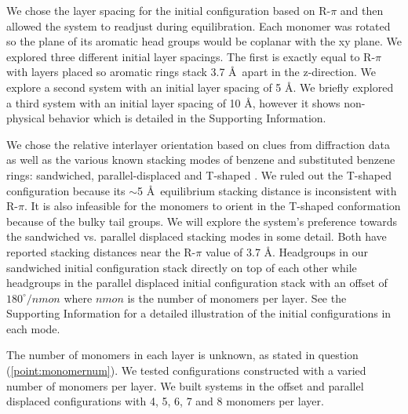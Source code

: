 \documentclass[journal=jpcbfk,manusciprt=article]{achemso}
\begin{document}
  We chose the layer spacing for the initial configuration based on R-$\pi$ and
  then allowed the system to readjust during equilibration. Each monomer was
  rotated so the plane of its aromatic head groups would be coplanar with the xy
  plane. We explored three different initial layer spacings. The first is exactly
  equal to R-$\pi$ with layers placed so aromatic rings stack 3.7 \AA~apart in
  the z-direction. We explore a second system with an initial layer spacing of 5
  \AA. We briefly explored a third system with an initial layer spacing of 10
  \AA, however it shows non-physical behavior which is detailed in the 
  Supporting Information. 


  We chose the relative interlayer orientation based on clues from diffraction
  data as well as the various known stacking modes of benzene and substituted
  benzene rings: sandwiched, parallel-displaced and T-shaped
  \cite{sinnokrot_estimates_2002}. We ruled out the T-shaped configuration
  because its $\sim$5 \AA~equilibrium stacking distance
  \cite{sinnokrot_estimates_2002} is inconsistent with R-$\pi$. It is also
  infeasible for the monomers to orient in the T-shaped conformation because of
  the bulky tail groups. We will explore the system's preference towards the
  sandwiched vs. parallel displaced stacking modes in some detail. Both have
  reported stacking distances near the R-$\pi$ value of 3.7 \AA. Headgroups in
  our sandwiched initial configuration stack directly on top of each other while
  headgroups in the parallel displaced initial configuration stack with an offset
  of $180^\circ/nmon$ where $nmon$ is the number of monomers per layer. See
  the Supporting Information for a detailed illustration of the initial
  configurations in each mode.

  The number of monomers in each layer is unknown, as stated in question
  (\ref{point:monomernum}). We tested configurations constructed with a varied
  number of monomers per layer. We built systems in the offset and parallel
  displaced configurations with 4, 5, 6, 7 and 8 monomers per layer.
\end{document}
